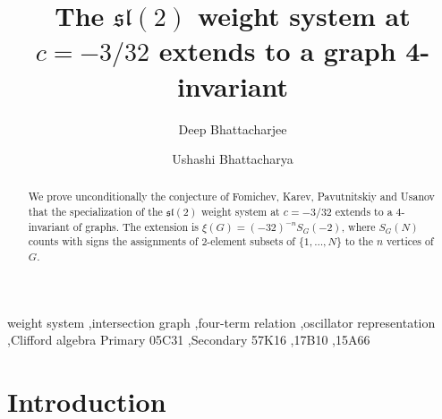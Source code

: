 \documentclass[preprint,12pt]{elsarticle}
\theoremstyle{definition}
\begin{document}
\begin{frontmatter}

\title{The \texorpdfstring{$\mathfrak{sl}(2)$}{sl(2)} weight system at \texorpdfstring{$c=-3/32$}{c=-3/32} extends to a graph 4-invariant}

\author[egspl,ucal]{Deep Bhattacharjee}

\author[ntu]{Ushashi Bhattacharya}

\begin{abstract}
We prove unconditionally the conjecture of Fomichev, Karev, Pavutnitskiy and Usanov that the specialization of the $\mathfrak{sl}(2)$ weight system at $c=-3/32$ extends to a $4$-invariant of graphs. The extension is $\xi(G)=(-32)^{-n}S_G(-2)$, where $S_G(N)$ counts with signs the assignments of $2$-element subsets of $\{1,\dots,N\}$ to the $n$ vertices of $G$.
\end{abstract}

\begin{keyword}
weight system \sep intersection graph \sep four-term relation \sep oscillator representation \sep Clifford algebra
\MSC[2020] Primary 05C31 \sep Secondary 57K16 \sep 17B10 \sep 15A66
\end{keyword}

\end{frontmatter}

\section{Introduction}\label{sec:intro}
\end{document}
